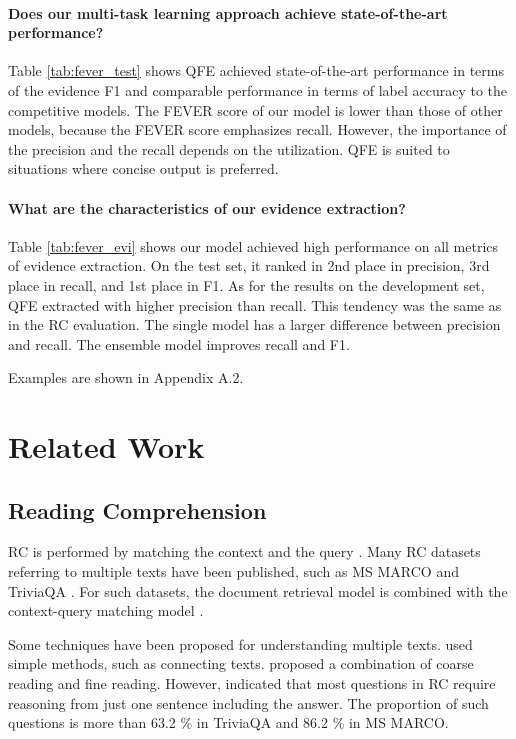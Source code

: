 \documentclass[11pt,a4paper]{article}
\theoremstyle{definition}
\begin{document}
	\paragraph{Does our multi-task learning approach achieve state-of-the-art performance?}
	Table \ref{tab:fever_test} shows QFE achieved state-of-the-art performance in terms of the evidence F1 and comparable performance in terms of label accuracy to the competitive models.
	The FEVER score of our model is lower than those of other models, because the FEVER score emphasizes recall. However, the importance of the precision and the recall depends on the utilization. QFE is suited to situations where concise output is preferred.

    \paragraph{What are the characteristics of our evidence extraction?}
    Table \ref{tab:fever_evi} shows our model achieved high performance on all metrics of evidence extraction. On the test set, it ranked in 2nd place in precision, 3rd place in recall, and 1st place in F1. As for the results on the development set, QFE extracted with higher precision than recall. This tendency was the same as in the RC evaluation. The single model has a larger difference between precision and recall. The ensemble model improves recall and F1.
    
    Examples are shown in Appendix A.2.


	\section{Related Work}
	\subsection{Reading Comprehension}
	RC is performed by matching the context and the query \cite{bidaf}. Many RC datasets referring to multiple texts have been published, such as MS MARCO \cite{marco} and TriviaQA \cite{triviaqa}. For such datasets, the document retrieval model is combined with the context-query matching model \cite{drqa, R3, evidence, CIKM}.
	
	Some techniques have been proposed for understanding multiple texts.
	\citet{simple} used simple methods, such as connecting texts. \citet{coarse1, coarse2} proposed a combination of coarse reading and fine reading.
	However, \citet{RCanal} indicated that
	most questions in RC require reasoning from just one sentence including the answer.
	The proportion of such questions is more than 63.2 \% in TriviaQA and 86.2 \% in MS MARCO.
	
\end{document}
